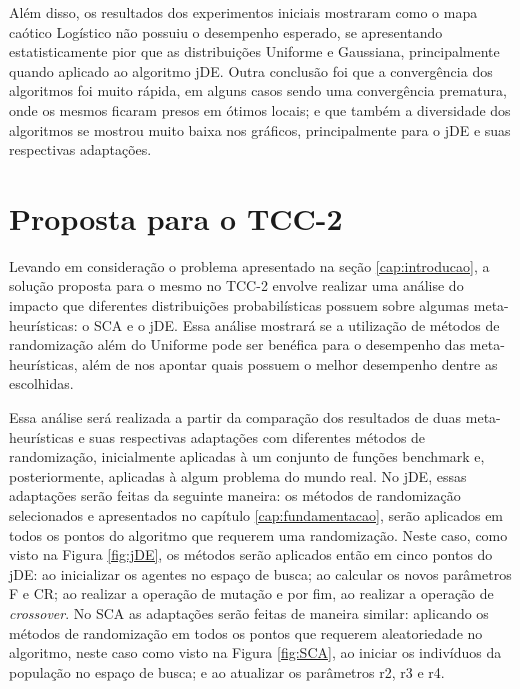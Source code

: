 Além disso, os resultados dos experimentos iniciais mostraram como o mapa caótico Logístico não possuiu o desempenho esperado, se apresentando estatisticamente pior que as distribuições Uniforme e Gaussiana, principalmente quando aplicado ao algoritmo jDE. Outra conclusão foi que a convergência dos algoritmos foi muito rápida, em alguns casos sendo uma convergência prematura, onde os mesmos ficaram presos em ótimos locais; e que também a diversidade dos algoritmos se mostrou muito baixa nos gráficos, principalmente para o jDE e suas respectivas adaptações.


\section{Proposta para o TCC-2}
\label{sec:solucao}


Levando em consideração o problema apresentado na seção \ref{cap:introducao}, a solução proposta para o mesmo no TCC-2 envolve realizar uma análise do impacto que diferentes distribuições probabilísticas possuem sobre algumas meta-heurísticas: o SCA e o jDE. Essa análise mostrará se a utilização de métodos de randomização além do Uniforme pode ser benéfica para o desempenho das meta-heurísticas, além de nos apontar quais possuem o melhor desempenho dentre as escolhidas.

Essa análise será realizada a partir da comparação dos resultados de duas meta-heurísticas e suas respectivas adaptações com diferentes métodos de randomização, inicialmente aplicadas à um conjunto de funções benchmark e, posteriormente, aplicadas à algum problema do mundo real. No jDE, essas adaptações serão feitas da seguinte maneira: os métodos de randomização selecionados e apresentados no capítulo \ref{cap:fundamentacao}, serão aplicados em todos os pontos do algoritmo que requerem uma randomização. Neste caso, como visto na Figura \ref{fig:jDE}, os métodos serão aplicados então em cinco pontos do jDE: ao inicializar os agentes no espaço de busca; ao calcular os novos parâmetros F e CR; ao realizar a operação de mutação e por fim, ao realizar a operação de \textit{crossover}. No SCA as adaptações serão feitas de maneira similar: aplicando os métodos de randomização em todos os pontos que requerem aleatoriedade no algoritmo, neste caso como visto na Figura \ref{fig:SCA}, ao iniciar os indivíduos da população no espaço de busca; e ao atualizar os parâmetros r2, r3 e r4.

